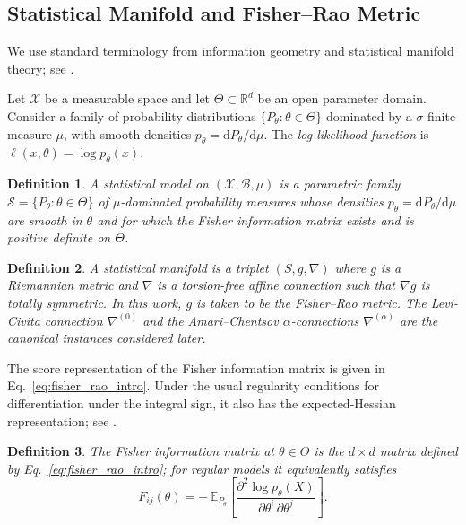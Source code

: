 \documentclass[a4paper,fleqn]{cas-dc}
\newtheorem{definition}{Definition}
\newcommand{\R}{\mathbb{R}}
\newcommand{\E}{\mathbb{E}}
\begin{document}
\subsection{Statistical Manifold and Fisher--Rao Metric}

We use standard terminology from information geometry and statistical
manifold theory; see \cite{lauritzen1987statistical,amari2000methods,
amari2012differential}.

Let $\mathcal{X}$ be a measurable space and let $\Theta\subset\R^d$ be an open
parameter domain. Consider a family of probability distributions
$\{P_\theta : \theta\in\Theta\}$ dominated by a $\sigma$-finite measure
$\mu$, with smooth densities $p_\theta = \mathrm{d}P_\theta/\mathrm{d}\mu$.
The \emph{log-likelihood function} is
$\ell(x,\theta)=\log p_\theta(x)$.

\begin{definition}%
  \label{def:statistical_model}
  A \emph{statistical model} on $(\mathcal{X},\mathcal{B},\mu)$ is a
  parametric family $\mathcal{S}=\{P_\theta:\theta\in\Theta\}$ of
  $\mu$-dominated probability measures whose densities
  $p_\theta=\mathrm{d}P_\theta/\mathrm{d}\mu$ are smooth in $\theta$ and
  for which the Fisher information matrix exists and is positive definite
  on $\Theta$.
\end{definition}

\begin{definition}%
  \label{def:statistical_manifold}
  A \emph{statistical manifold} is a triplet $(S,g,\nabla)$ where $g$ is
  a Riemannian metric and $\nabla$ is a torsion-free affine connection such
  that $\nabla g$ is totally symmetric.
  In this work, $g$ is taken to be the Fisher--Rao metric. The Levi-Civita
  connection $\nabla^{(0)}$ and the Amari--Chentsov
  $\alpha$-connections $\nabla^{(\alpha)}$ are the canonical instances
  considered later.
\end{definition}

The score representation of the Fisher information matrix is given in
Eq.~\eqref{eq:fisher_rao_intro}. Under the usual regularity conditions for
differentiation under the integral sign, it also has the expected-Hessian
representation; see \cite{rao1945information,amari2000methods}.

\begin{definition}%
  \label{def:fim}
  The \emph{Fisher information matrix} at $\theta\in\Theta$ is the
  $d\times d$ matrix defined by Eq.~\eqref{eq:fisher_rao_intro}; for regular
  models it equivalently satisfies
  \begin{equation}
    F_{ij}(\theta)
    = -\,\E_{P_\theta}\!\left[
    \frac{\partial^2 \log p_\theta(X)}
         {\partial \theta^i\,\partial \theta^j}
    \right].
  \end{equation}
\end{definition}
\end{document}
